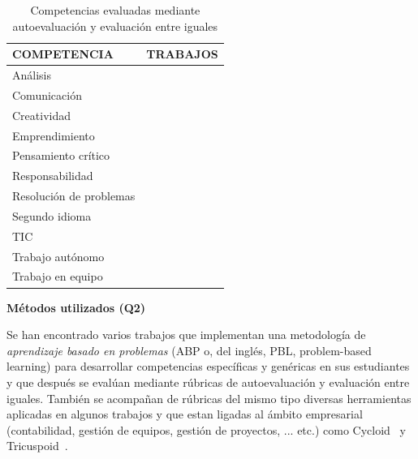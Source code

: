 \begin{table}
  \begin{center}
  \begin{tabular}{| m{3.5cm} | m{9cm} |}
    \hline
    COMPETENCIA & TRABAJOS\\
    \hline
    \hline
    Análisis & \cite{sin2007evaluating,carreras2013promotion,lasa2013problem} \\
    \hline
    Comunicación &  \cite{masip2013self,barbera2011assessment,ruizacarate2013soft,sin2007evaluating,carreras2013promotion,johnson2002encouraging} \\
    \hline
    Creatividad & \cite{piedra2010measuring} \\
    \hline
    Emprendimiento & \cite{DeXena2012educacion,chang2009international,marquez2010have,achcaoucaou2014competence} \\
    \hline
    Pensamiento crítico & \cite{arno2011promoting,pinto2011assessment} \\
    \hline
    Responsabilidad & \cite{ruizacarate2013soft,carreras2013promotion} \\
    \hline
    Resolución de problemas & \cite{johnson2002encouraging} \\
    \hline 
    Segundo idioma & \cite{renau2010teaching,masip2013self,sevilla2012assessment} \\
    \hline
    TIC & \cite{lasa2013problem} \\
    \hline
    Trabajo autónomo &  \cite{lasa2013problem} \\
    \hline
    Trabajo en equipo &  \cite{masip2013self,ficapal2015learning,khamis2012measurement,barbera2011assessment,ruizacarate2013soft,piedra2010measuring,mcloughlin2006beyond,carreras2013promotion,lasa2013problem,johnson2002encouraging} \\
    \hline
  \end{tabular}
\end{center}
\caption{Competencias evaluadas mediante autoevaluación y evaluación entre iguales}
\label{tab:CompetenciasAuto}
\end{table} 



\bigskip
\textbf{Métodos utilizados (Q2)}
\bigskip

Se han encontrado varios trabajos que implementan una metodología de \emph{aprendizaje basado en problemas} (ABP o, del inglés, PBL, problem-based learning) para desarrollar competencias específicas y genéricas en sus estudiantes y que después se evalúan mediante rúbricas de autoevaluación y evaluación entre iguales. También se acompañan de rúbricas del mismo tipo diversas herramientas aplicadas en algunos trabajos y que estan ligadas al ámbito empresarial (contabilidad, gestión de equipos, gestión de proyectos, ... etc.) como Cycloid~\cite{chang2009international} y Tricuspoid~\cite{achcaoucaou2014competence}.

